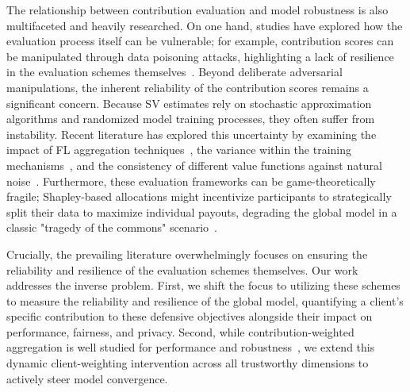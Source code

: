 \documentclass[acmsmall]{acmart}
\begin{document}
The relationship between contribution evaluation and model robustness is also multifaceted and heavily researched. On one hand, studies have explored how the evaluation process itself can be vulnerable; for example, contribution scores can be manipulated through data poisoning attacks, highlighting a lack of resilience in the evaluation schemes themselves~\cite{xu2024ace,pejo2025fragility}. Beyond deliberate adversarial manipulations, the inherent reliability of the contribution scores remains a significant concern. Because SV estimates rely on stochastic approximation algorithms and randomized model training processes, they often suffer from instability. Recent literature has explored this uncertainty by examining the impact of FL aggregation techniques~\cite{pejo2025fragility}, the variance within the training mechanisms~\cite{goldwasser2024stabilizing}, and the consistency of different value functions against natural noise~\cite{wang2023data}. Furthermore, these evaluation frameworks can be game-theoretically fragile; Shapley-based allocations might incentivize participants to strategically split their data to maximize individual payouts, degrading the global model in a classic "tragedy of the commons" scenario~\cite{qi2024mechanism}. 

Crucially, the prevailing literature overwhelmingly focuses on ensuring the reliability and resilience of the evaluation schemes themselves. Our work addresses the inverse problem. First, we shift the focus to utilizing these schemes to measure the reliability and resilience of the global model, quantifying a client's specific contribution to these defensive objectives alongside their impact on performance, fairness, and privacy. Second, while contribution-weighted aggregation is well studied for performance and robustness~\cite{sun2023shapleyfl,tastan2024redefining,guan2022few,otmani2024fedsv}, we extend this dynamic client-weighting intervention across all trustworthy dimensions to actively steer model convergence.
\end{document}

